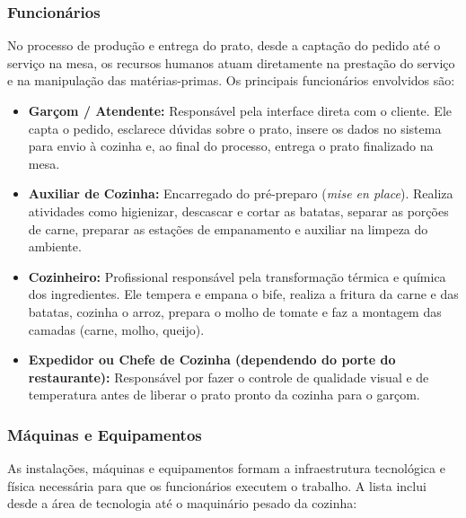 \documentclass[12pt, a4paper]{article}
\begin{document}
\subsubsection*{Funcionários}

No processo de produção e entrega do prato, desde a captação do pedido até o serviço na mesa, os recursos humanos atuam diretamente na prestação do serviço e na manipulação das matérias-primas. Os principais funcionários envolvidos são:

\begin{itemize}
    \item \textbf{Garçom / Atendente:} Responsável pela interface direta com o cliente. Ele capta o pedido, esclarece dúvidas sobre o prato, insere os dados no sistema para envio à cozinha e, ao final do processo, entrega o prato finalizado na mesa.
    \item \textbf{Auxiliar de Cozinha:} Encarregado do pré-preparo (\textit{mise en place}). Realiza atividades como higienizar, descascar e cortar as batatas, separar as porções de carne, preparar as estações de empanamento e auxiliar na limpeza do ambiente.
    \item \textbf{Cozinheiro:} Profissional responsável pela transformação térmica e química dos ingredientes. Ele tempera e empana o bife, realiza a fritura da carne e das batatas, cozinha o arroz, prepara o molho de tomate e faz a montagem das camadas (carne, molho, queijo).
    \item \textbf{Expedidor ou Chefe de Cozinha (dependendo do porte do restaurante):} Responsável por fazer o controle de qualidade visual e de temperatura antes de liberar o prato pronto da cozinha para o garçom.
\end{itemize}

\subsubsection*{Máquinas e Equipamentos}

As instalações, máquinas e equipamentos formam a infraestrutura tecnológica e física necessária para que os funcionários executem o trabalho. A lista inclui desde a área de tecnologia até o maquinário pesado da cozinha:
\end{document}
